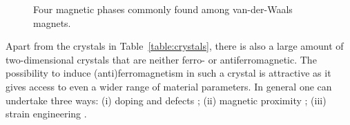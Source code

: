 \begin{figure}[bt]
    \centering
    \hspace{0.05\textwidth}
    \hspace{0.05\textwidth}
    \hspace{0.05\textwidth}
    \caption{Four magnetic phases commonly found among van-der-Waals magnets.  }
    \label{fig:magnetic_phases}
\end{figure}

Apart from the crystals in Table~\ref{table:crystals}, there is also a large amount of two-dimensional crystals that are neither ferro- or antiferromagnetic. The possibility to induce (anti)ferromagnetism in such a crystal is attractive as it gives access to even a wider range of material parameters. In general one can undertake three ways: (i) doping and defects \cite{gonzalez-herrero_atomic-scale_2016, han_perspectives_2016, ugeda_missing_2010, han_graphene_2014}; (ii) magnetic proximity \cite{gonzalez-herrero_atomic-scale_2016, han_perspectives_2016, ugeda_missing_2010, han_graphene_2014}; (iii) strain engineering \cite{shen_strain_2016, chittari_carrier-_2020}.

